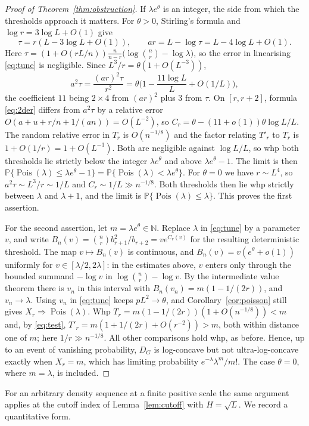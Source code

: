 \documentclass[11pt]{article}
\theoremstyle{remark}
\newcommand{\PP}{\mathbb P}
\newcommand{\Pois}{\operatorname{Pois}}
\begin{document}
\begin{proof}[Proof of Theorem~\ref{thm:obstruction}]
If $\lambda e^\theta$ is an integer, the side from which the thresholds approach it matters. For $\theta>0$, Stirling's formula and $\log r=3\log L+O(1)$ give
\[
 \tau=r(L-3\log L+O(1)),\qquad ar=L-\log\tau=L-4\log L+O(1).
\]
Here $\tau=(1+O(rL/n))\frac{n}{n-r}\big(\log\binom nr-\log\lambda\big)$, so the error in linearising \eqref{eq:tune} is negligible. Since $L^3/r=\theta(1+O(L^{-3}))$,
\[
 a^2\tau=\frac{(ar)^2\tau}{r^2}=\theta\Big(1-\frac{11\log L}{L}+O(1/L)\Big),
\]
the coefficient $11$ being $2\times4$ from $(ar)^2$ plus $3$ from $\tau$. On $[r,r+2]$, formula \eqref{eq:2der} differs from $a^2\tau$ by a relative error $O(a+u+r/n+1/(an))=O(L^{-2})$, so $C_r=\theta-(11+o(1))\theta\log L/L$. The random relative error in $T_r$ is $O(n^{-1/8})$ and the factor relating $T'_r$ to $T_r$ is $1+O(1/r)=1+O(L^{-3})$. Both are negligible against $\log L/L$, so whp both thresholds lie strictly below the integer $\lambda e^\theta$ and above $\lambda e^\theta-1$. The limit is then $\PP\{\Pois(\lambda)\le\lambda e^\theta-1\}=\PP\{\Pois(\lambda)<\lambda e^\theta\}$. For $\theta=0$ we have $r\sim L^4$, so $a^2\tau\sim L^3/r\sim1/L$ and $C_r\sim1/L\gg n^{-1/8}$. Both thresholds then lie whp strictly between $\lambda$ and $\lambda+1$, and the limit is $\PP\{\Pois(\lambda)\le\lambda\}$. This proves the first assertion.

For the second assertion, let $m=\lambda e^\theta\in\mathbb N$. Replace $\lambda$ in \eqref{eq:tune} by a parameter $v$, and write $B_n(v)=\binom nrb_{r+1}^2/b_{r+2}=ve^{C_r(v)}$ for the resulting deterministic threshold. The map $v\mapsto B_n(v)$ is continuous, and $B_n(v)=v(e^\theta+o(1))$ uniformly for $v\in[\lambda/2,2\lambda]$: in the estimates above, $v$ enters only through the bounded summand $-\log v$ in $\log\binom nr-\log v$. By the intermediate value theorem there is $v_n$ in this interval with $B_n(v_n)=m(1-1/(2r))$, and $v_n\to\lambda$. Using $v_n$ in \eqref{eq:tune} keeps $pL^2\to\theta$, and Corollary~\ref{cor:poisson} still gives $X_r\Rightarrow\Pois(\lambda)$. Whp $T_r=m(1-1/(2r))(1+O(n^{-1/8}))<m$ and, by \eqref{eq:test}, $T'_r=m(1+1/(2r)+O(r^{-2}))>m$, both within distance one of $m$; here $1/r\gg n^{-1/8}$. All other comparisons hold whp, as before. Hence, up to an event of vanishing probability, $D_G$ is log-concave but not ultra-log-concave exactly when $X_r=m$, which has limiting probability $e^{-\lambda}\lambda^m/m!$. The case $\theta=0$, where $m=\lambda$, is included.
\end{proof}

For an arbitrary density sequence at a finite positive scale the same argument applies at the cutoff index of Lemma~\ref{lem:cutoff} with $H=\sqrt L$. We record a quantitative form.
\end{document}

